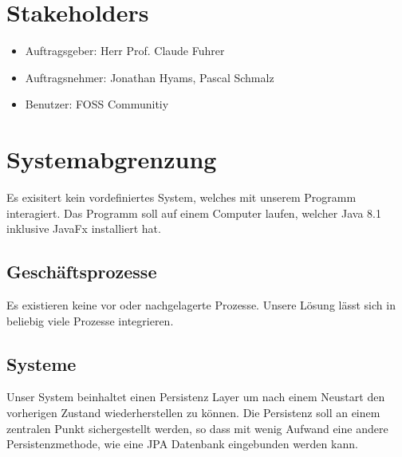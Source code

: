 \documentclass[11pt,titelpage]{scrartcl}
\begin{document}
\section{Stakeholders}
\begin{itemize}
\item{Auftragsgeber: Herr Prof. Claude Fuhrer}
\item{Auftragsnehmer: Jonathan Hyams, Pascal Schmalz}
\item{Benutzer: FOSS Communitiy}
\end{itemize}
\section {Systemabgrenzung}
Es exisitert kein vordefiniertes System, welches mit unserem Programm interagiert.
Das Programm soll auf einem Computer laufen, welcher Java 8.1 inklusive JavaFx installiert hat.

\subsection{Geschäftsprozesse}
Es existieren keine vor\- oder nachgelagerte Prozesse. Unsere Lösung lässt sich in beliebig viele Prozesse integrieren.
\subsection{Systeme}
Unser System beinhaltet einen Persistenz Layer um nach einem Neustart den vorherigen Zustand wiederherstellen zu können.
Die Persistenz soll an einem zentralen Punkt sichergestellt werden, so dass mit wenig Aufwand eine andere
Persistenzmethode, wie eine JPA Datenbank eingebunden werden kann.
\end{document}

